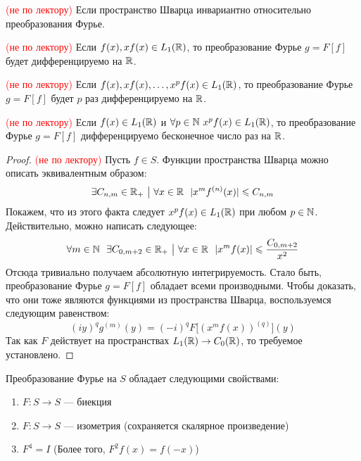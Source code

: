 \begin{proposition} \textcolor{red}{(не по лектору)}
	Если пространство Шварца инвариантно относительно преобразования Фурье.
\end{proposition}

\begin{reminder} \textcolor{red}{(не по лектору)}
	Если $f(x), xf(x) \in L_1(\mathbb{R})$, то преобразование Фурье $g = F[f]$ будет дифференцируемо на $\mathbb{R}$.
\end{reminder}

\begin{corollary} \textcolor{red}{(не по лектору)}
	Если $f(x), xf(x), \ldots, x^pf(x) \in L_1(\mathbb{R})$, то преобразование Фурье $g = F[f]$ будет $p$ раз дифференцируемо на $\mathbb{R}$.
\end{corollary}

\begin{corollary} \textcolor{red}{(не по лектору)}
	Если $f(x) \in L_1(\mathbb{R})$ и $\forall p \in \mathbb{N}\ x^pf(x) \in L_1(\mathbb{R})$, то преобразование Фурье $g = F[f]$ дифференцируемо бесконечное число раз на $\mathbb{R}$.
\end{corollary}

\begin{proof} \textcolor{red}{(не по лектору)}
	Пусть $f \in S$. Функции пространства Шварца можно описать эквивалентным образом:
	\[
		\exists C_{n, m} \in \R_+ \such \forall x \in \R\ \ |x^mf^{(n)}(x)| \le C_{n, m}
	\]
	Покажем, что из этого факта следует $x^pf(x) \in L_1(\mathbb{R})$ при любом $p \in \mathbb{N}$. Действительно, можно написать следующее:
	\[
		\forall m \in \N\ \ \exists C_{0, m + 2} \in \R_+ \such \forall x \in \R\ \ |x^mf(x)| \le \frac{C_{0, m + 2}}{x^2}
	\]
	Отсюда тривиально получаем абсолютную интегрируемость. Стало быть, преобразование Фурье $g = F[f]$ обладает всеми производными. Чтобы доказать, что они тоже являются функциями из пространства Шварца, воспользуемся следующим равенством:
	\[
		(iy)^qg^{(m)}(y) = (-i)^qF\big[(x^mf(x))^{(q)}\big](y)
	\]
	Так как $F$ действует на пространствах $L_1(\mathbb{R}) \to C_0(\mathbb{R})$, то требуемое установлено.
\end{proof}

\begin{proposition}
	Преобразование Фурье на $S$ обладает следующими свойствами:
	\begin{enumerate}
		\item $F \colon S \to S$ --- биекция
		
		\item $F \colon S \to S$ --- изометрия (сохраняется скалярное произведение)
		
		\item $F^4 = I$ (Более того, $F^2f(x) = f(-x)$)
	\end{enumerate}
\end{proposition}

